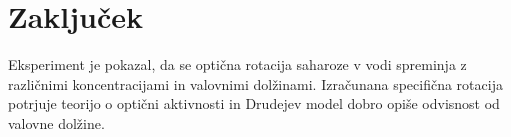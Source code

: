 \documentclass[9pt,a4paper,twocolumn,twoside]{tau-class/tau}
\begin{document}
\section{Zaključek}

Eksperiment je pokazal, da se optična rotacija saharoze v vodi spreminja z različnimi koncentracijami in valovnimi dolžinami. Izračunana specifična rotacija potrjuje teorijo o optični aktivnosti in Drudejev model dobro opiše odvisnost od valovne dolžine.

\printbibliography
\end{document}
